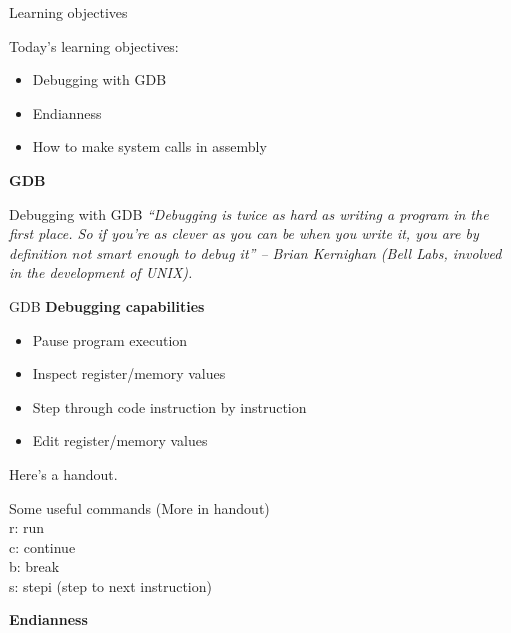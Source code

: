 \documentclass[hyphens,aspectratio=169,dvipsnames]{beamer}
\begin{document}
\begin{frame}{Learning objectives}

Today's learning objectives:
    \begin{itemize}
        \item Debugging with GDB
        \item Endianness
        \item How to make system calls in assembly
    \end{itemize}
\end{frame}

\begin{frame}
    \vspace{1cm}
    \hspace{5cm}
    \textbf{GDB}
\end{frame}


\begin{frame}{Debugging with GDB}
    \textit{``Debugging is twice as hard as writing a program in the first place. So if you're as clever as you can be when you write it, you are by definition not smart enough to debug it'' -- Brian Kernighan (Bell Labs, involved in the development of UNIX).}

\end{frame}

\begin{frame}{GDB}
    \textbf{Debugging capabilities}
    \begin{itemize}
        \item Pause program execution
        \item Inspect register/memory values
        \item Step through code instruction by instruction
        \item Edit register/memory values
    \end{itemize}

    \pause Here's a handout.
\end{frame}

\begin{frame}{Some useful commands}
    (More in handout) \\
    r: run \\
    c: continue \\
    b: break \\
    s: stepi (step to next instruction) \\
\end{frame}

\begin{frame}
    \vspace{1cm}
    \hspace{5cm}
    \textbf{Endianness}
\end{frame}
\end{document}
